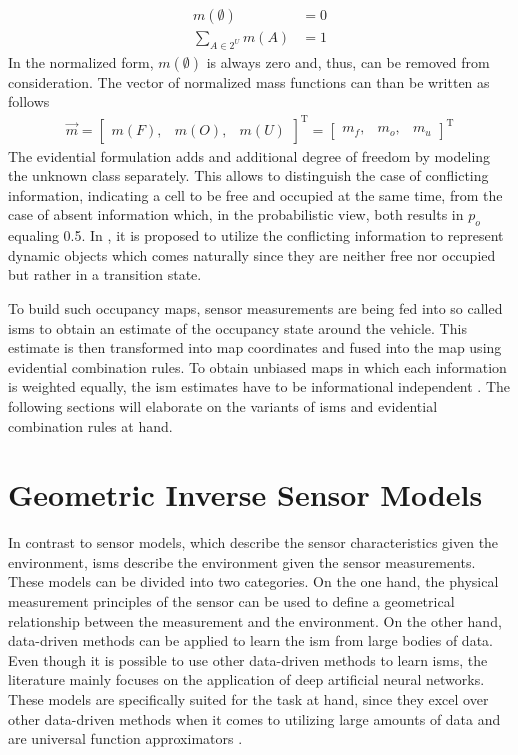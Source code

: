 \begin{align}
	\label{eq:evidential_norm}
	m(\emptyset) &= 0\\
	\sum_{A \in 2^{U}} m(A) &= 1
\end{align} 
In the normalized form, $m(\emptyset)$ is always zero and, thus, can be removed from consideration. The vector of normalized mass functions can than be written as follows
\begin{align}
	\vec{m} = \begin{bmatrix} m(F), & m(O), & m(U) \end{bmatrix}^{\text{T}} = \begin{bmatrix} m_f, & m_o, & m_u \end{bmatrix}^{\text{T}}
\end{align}
The evidential formulation adds and additional degree of freedom by modeling the unknown class separately. This allows to distinguish the case of conflicting information, indicating a cell to be free and occupied at the same time, from the case of absent information which, in the probabilistic view, both results in $p_o$ equaling 0.5. In \cite{moras2011moving,yu2015evidential,kurdej2012map}, it is proposed to utilize the conflicting information to represent dynamic objects which comes naturally since they are neither free nor occupied but rather in a transition state.

To build such occupancy maps, sensor measurements are being fed into so called \gls{ism}s to obtain an estimate of the occupancy state around the vehicle. This estimate is then transformed into map coordinates and fused into the map using evidential combination rules. To obtain unbiased maps in which each information is weighted equally, the \gls{ism} estimates have to be informational independent \cite{pagac1996evidential}. The following sections will elaborate on the variants of \gls{ism}s and evidential combination rules at hand.
%
\section{Geometric Inverse Sensor Models}
\label{sec:geo_ism}
In contrast to sensor models, which describe the sensor characteristics given the environment, \gls{ism}s describe the environment given the sensor measurements. These models can be divided into two categories. On the one hand, the physical measurement principles of the sensor can be used to define a geometrical relationship between the measurement and the environment. On the other hand, data-driven methods can be applied to learn the \gls{ism} from large bodies of data. Even though it is possible to use other data-driven methods to learn \gls{ism}s, the literature mainly focuses on the application of deep artificial neural networks. These models are specifically suited for the task at hand, since they excel over other data-driven methods when it comes to utilizing large amounts of data \cite{zhou2014big} and are universal function approximators \cite{hornik1991approximation}.
%
